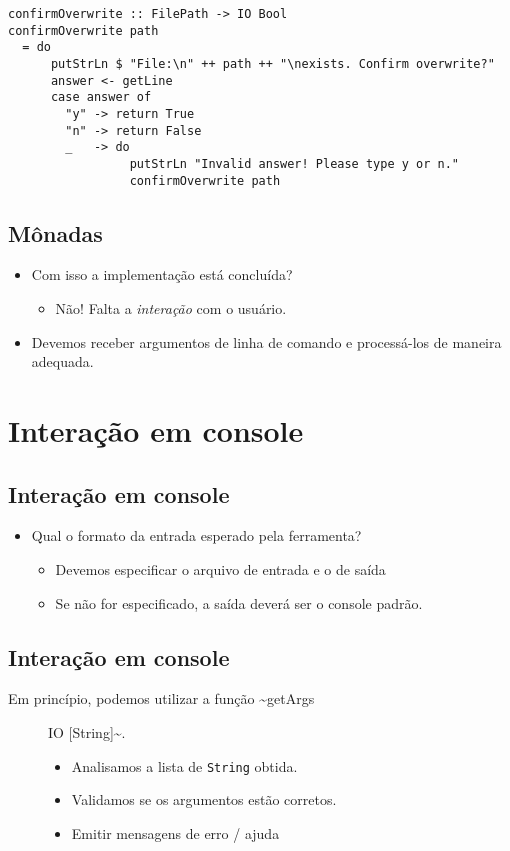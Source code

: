 \documentclass[11pt]{article}
\begin{document}
\begin{verbatim}
confirmOverwrite :: FilePath -> IO Bool
confirmOverwrite path
  = do
      putStrLn $ "File:\n" ++ path ++ "\nexists. Confirm overwrite?"
      answer <- getLine
      case answer of
        "y" -> return True
        "n" -> return False
        _   -> do
                 putStrLn "Invalid answer! Please type y or n."
                 confirmOverwrite path
\end{verbatim}
\subsection*{Mônadas}
\label{sec:orgafab664}

\begin{itemize}
\item Com isso a implementação está concluída?
\begin{itemize}
\item Não! Falta a \emph{interação} com o usuário.
\end{itemize}

\item Devemos receber argumentos de linha de comando e processá-los de maneira adequada.
\end{itemize}
\section*{Interação em console}
\label{sec:org2f5c801}

\subsection*{Interação em console}
\label{sec:org10937a4}

\begin{itemize}
\item Qual o formato da entrada esperado pela ferramenta?
\begin{itemize}
\item Devemos especificar o arquivo de entrada e o de saída
\item Se não for especificado, a saída deverá ser o console padrão.
\end{itemize}
\end{itemize}
\subsection*{Interação em console}
\label{sec:orgcb99f2a}

\begin{description}
\item[{Em princípio, podemos utilizar a função \textasciitilde{}getArgs}] IO [String]\textasciitilde{}.
\begin{itemize}
\item Analisamos a lista de \texttt{String} obtida.
\item Validamos se os argumentos estão corretos.
\item Emitir mensagens de erro / ajuda
\end{itemize}
\end{description}
\end{document}
